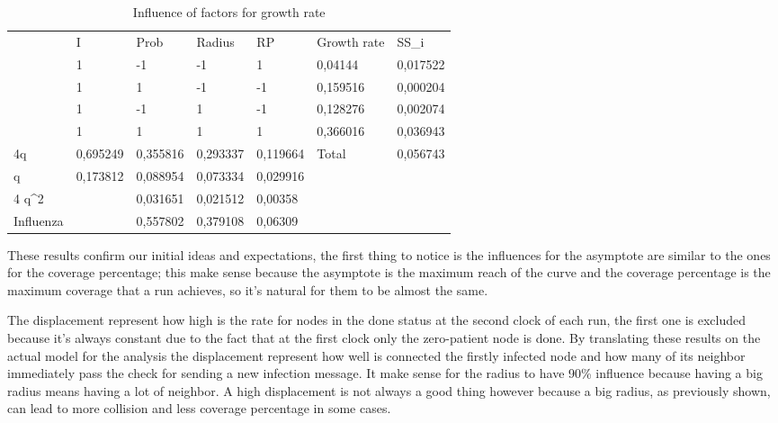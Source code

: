 \begin{table}[H]
\centering
\begin{tabular}{l|l|l|l|l|ll}
\cline{2-7}
 & I & Prob & Radius & RP & \multicolumn{1}{l|}{Growth rate} & \multicolumn{1}{l|}{SS\_i} \\ \cline{2-7} 
 & 1 & -1 & -1 & 1 & \multicolumn{1}{l|}{0,04144} & \multicolumn{1}{l|}{0,017522} \\ \cline{2-7} 
 & 1 & 1 & -1 & -1 & \multicolumn{1}{l|}{0,159516} & \multicolumn{1}{l|}{0,000204} \\ \cline{2-7} 
 & 1 & -1 & 1 & -1 & \multicolumn{1}{l|}{0,128276} & \multicolumn{1}{l|}{0,002074} \\ \cline{2-7} 
 & 1 & 1 & 1 & 1 & \multicolumn{1}{l|}{0,366016} & \multicolumn{1}{l|}{0,036943} \\ \hline
\multicolumn{1}{|l|}{4q} & 0,695249 & 0,355816 & 0,293337 & 0,119664 & \multicolumn{1}{l|}{Total} & \multicolumn{1}{l|}{0,056743} \\ \hline
\multicolumn{1}{|l|}{q} & 0,173812 & 0,088954 & 0,073334 & 0,029916 &  &  \\ \cline{1-5}
\multicolumn{1}{|l|}{4 q\textasciicircum{}2} &  & 0,031651 & 0,021512 & 0,00358 &  &  \\ \cline{1-5}
\multicolumn{1}{|l|}{Influenza} &  & 0,557802 & 0,379108 & 0,06309 &  &  \\ \cline{1-5}
\end{tabular}
\caption{Influence of factors for growth rate}
\end{table}

These results confirm our initial ideas and expectations, the first thing to notice is the influences for the asymptote are similar to the ones for the coverage percentage; this make sense because the asymptote is the maximum reach of the curve and the coverage percentage is the maximum coverage that a run achieves, so it's natural for them to be almost the same. 

\medskip
The displacement represent how high is the rate for nodes in the done status at the second clock of each run, the first one is excluded because it's always constant due to the fact that at the first clock only the zero-patient node is done. By translating these results on the actual model for the analysis the displacement represent how well is connected the firstly infected node and how many of its neighbor immediately pass the check for sending a new infection message. It make sense for the radius to have 90\% influence because   having a big radius means having a lot of neighbor. A high displacement is not always a good thing however because a big radius, as previously shown, can lead to more collision and less coverage percentage in some cases. 

